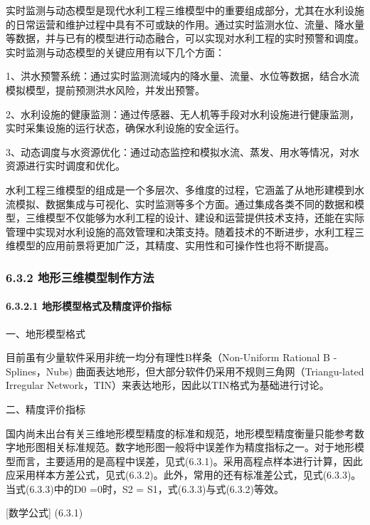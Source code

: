 实时监测与动态模型是现代水利工程三维模型中的重要组成部分，尤其在水利设施的日常运营和维护过程中具有不可或缺的作用。通过实时监测水位、流量、降水量等数据，并与已有的模型进行动态融合，可以实现对水利工程的实时预警和调度。实时监测与动态模型的关键应用有以下几个方面：

1、洪水预警系统：通过实时监测流域内的降水量、流量、水位等数据，结合水流模拟模型，提前预测洪水风险，并发出预警。

2、水利设施的健康监测：通过传感器、无人机等手段对水利设施进行健康监测，实时采集设施的运行状态，确保水利设施的安全运行。

3、动态调度与水资源优化：通过动态监控和模拟水流、蒸发、用水等情况，对水资源进行实时调度和优化。

水利工程三维模型的组成是一个多层次、多维度的过程，它涵盖了从地形建模到水流模拟、数据集成与可视化、实时监测等多个方面。通过集成各类不同的数据和模型，三维模型不仅能够为水利工程的设计、建设和运营提供技术支持，还能在实际管理中实现对水利设施的高效管理和决策支持。随着技术的不断进步，水利工程三维模型的应用前景将更加广泛，其精度、实用性和可操作性也将不断提高。

\subsubsection{6.3.2 地形三维模型制作方法}\label{ux5730ux5f62ux4e09ux7ef4ux6a21ux578bux5236ux4f5cux65b9ux6cd5}

\paragraph{6.3.2.1 地形模型格式及精度评价指标}\label{ux5730ux5f62ux6a21ux578bux683cux5f0fux53caux7cbeux5ea6ux8bc4ux4ef7ux6307ux6807}

一、地形模型格式

目前虽有少量软件采用非统一均分有理性B样条（Non-Uniform Rational B -Splines，Nubs) 曲面表达地形，但大部分软件仍采用不规则三角网（Triangu-lated Irregular Network，TIN）来表达地形，因此以TIN格式为基础进行讨论。

二、精度评价指标

国内尚未出台有关三维地形模型精度的标准和规范，地形模型精度衡量只能参考数字地形图相关标准规范。数字地形图一般将中误差作为精度指标之一。对于地形模型而言，主要适用的是高程中误差，见式(6.3.1)。采用高程点样本进行计算，因此应采用样本方差公式，见式(6.3.2)。此外，常用的还有标准差公式，见式(6.3.3)。当式(6.3.3)中的D0 =0时，S2 = S1，式(6.3.3)与式(6.3.2)等效。

{[}数学公式{]} (6.3.1)

